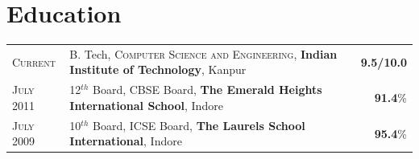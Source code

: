 \documentclass[a4paper]{article} %
\newcommand{\highlight}[2]{
    \begin{tabular}{p{2.4cm}|l}
        \textsc {\large #1} & #2
    \end{tabular}
}
\begin{document}
%
%


\section{Education}
\begin{tabular}{>{\raggedleft}p{1.5cm}p{15cm}r}

    \textsc{Current} & B. Tech, \textsc{Computer Science and Engineering},
    \textbf{Indian Institute of Technology}, Kanpur
    & \textbf{9.5/10.0}\\

    \textsc{July 2011} & 12$^{th}$ Board, \textsc{CBSE} Board,
    \textbf{The Emerald Heights International School}, Indore
    & \textbf{91.4}\% \\

    \textsc{July 2009} & 10$^{th}$ Board, \textsc{ICSE} Board,
    \textbf{The Laurels School International}, Indore
    & \textbf{95.4}\% \\

\end{tabular}

\end{document}
